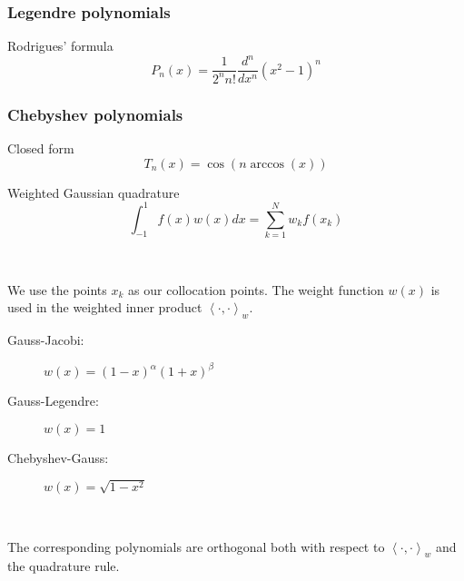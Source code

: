 \documentclass{beamer}
\newcommand{\inner}[2]{\left \langle #1, #2 \right \rangle}
\begin{document}
\begin{frame}

\frametitle{Legendre polynomials}

\begin{block}{Rodrigues' formula}
\begin{equation*}
P_n(x) = \frac{1}{2^n n!} \frac{d^n}{dx^n} (x^2-1)^n
\end{equation*}
\end{block}


\end{frame}

\begin{frame}

\frametitle{Chebyshev polynomials}

\begin{block}{Closed form}
\begin{equation*}
T_n(x) = \cos \left ( n \arccos \left ( x \right ) \right )
\end{equation*}
\end{block}


\end{frame}

\begin{frame}

\begin{block}{Weighted Gaussian quadrature}
\begin{equation*}
\int_{-1}^1 f(x) w(x) dx = \sum_{k=1}^N w_k f(x_k)
\end{equation*}
\end{block}

~

We use the points $x_k$ as our collocation points.
The weight function $w(x)$ is used in the weighted inner product
$
\inner{\cdot}{\cdot}_w .
$

\end{frame}

\begin{frame}

\begin{description}
\item[Gauss-Jacobi:] $w(x) = (1-x)^\alpha (1+x)^\beta$
\item[Gauss-Legendre:] $w(x) = 1$
\item[Chebyshev-Gauss:] $w(x) = \sqrt{1-x^2}$
\end{description}

~

The corresponding polynomials are orthogonal both with respect to $\inner{\cdot}{\cdot}_w$ and the quadrature rule.

\end{frame}
\end{document}
